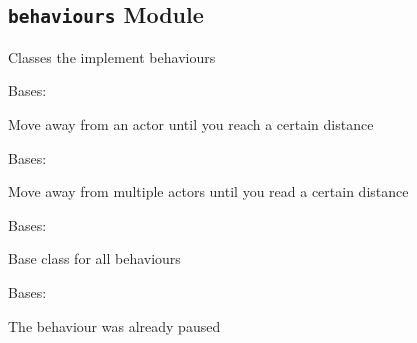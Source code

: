 \documentclass[letterpaper,10pt,english]{sphinxmanual}
\begin{document}
\subsection{\texttt{behaviours} Module}
\label{blocks:behaviours-module}\label{blocks:module-serge.blocks.behaviours}
Classes the implement behaviours

\begin{fulllineitems}
\label{blocks:serge.blocks.behaviours.AvoidActor}
Bases: {\hyperref[blocks:serge.blocks.behaviours.Behaviour]{}}

Move away from an actor until you reach a certain distance

\end{fulllineitems}


\begin{fulllineitems}
\label{blocks:serge.blocks.behaviours.AvoidActorsWithTag}
Bases: {\hyperref[blocks:serge.blocks.behaviours.Behaviour]{}}

Move away from multiple actors until you read a certain distance

\end{fulllineitems}


\begin{fulllineitems}
\label{blocks:serge.blocks.behaviours.Behaviour}
Bases: {\hyperref[common:serge.common.Loggable]{}}

Base class for all behaviours

\end{fulllineitems}


\begin{fulllineitems}
\label{blocks:serge.blocks.behaviours.BehaviourAlreadyPaused}
Bases: 

The behaviour was already paused

\end{fulllineitems}
\end{document}
